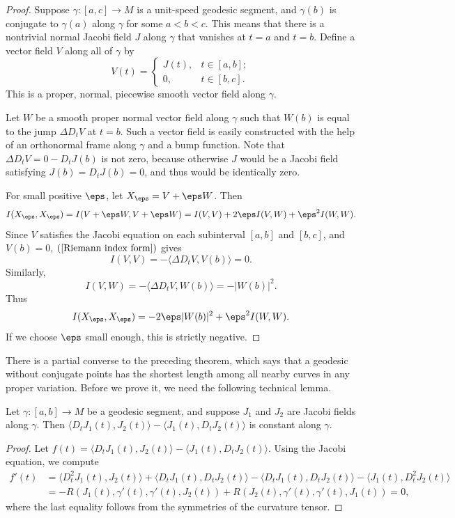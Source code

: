 \begin{proof}
Suppose $\gamma:[a,c]\to M$ is a unit-speed geodesic segment, and $\gamma(b)$ is conjugate to $\gamma(a)$ along $\gamma$ for some $a<b<c$. This means that there is a 
nontrivial normal Jacobi field $J$ along $\gamma$ that vanishes at $t=a$ and $t=b$. Define a vector field $V$ along all of $\gamma$ by
\[V(t)=\begin{cases}
J(t),&t\in[a,b];\\
0,&t\in[b,c].
\end{cases}\]
This is a proper, normal, piecewise smooth vector field along $\gamma$.\par
Let $W$ be a smooth proper normal vector field along $\gamma$ such that $W(b)$ is equal to the jump $\Delta D_tV$ at $t=b$. Such a vector field is easily constructed 
with the help of an orthonormal frame along $\gamma$ and a bump function. Note that $\Delta D_tV=0-D_tJ(b)$ is not zero, because otherwise $J$ would be a Jacobi field 
satisfying $J(b)=D_tJ(b)=0$, and thus would be identically zero.\par
For small positive $\eps$, let $X_{\eps}=V+\eps W$. Then
\begin{align*}
I(X_\eps,X_{\eps})=I(V+\eps W,V+\eps W)=I(V,V)+2\eps I(V,W)+\eps^2 I(W,W).
\end{align*}
Since $V$ satisfies the Jacobi equation on each subinterval $[a,b]$ and $[b,c]$, and $V(b)=0$, $(\ref{Riemann index form})$ gives
\[I(V,V)=-\langle\Delta D_tV,V(b)\rangle=0.\]
Similarly,
\[I(V,W)=-\langle\Delta D_tV,W(b)\rangle=-|W(b)|^2.\]
Thus
\[I(X_\eps,X_\eps)=-2\eps|W(b)|^2+\eps^2I(W,W).\]
If we choose $\eps$ small enough, this is strictly negative.
\end{proof}
There is a partial converse to the preceding theorem, which says that a geodesic without conjugate points has the shortest length among all nearby curves in any proper 
variation. Before we prove it, we need the following technical lemma.
\begin{lemma}\label{Riemann no int conjugate lem}
Let $\gamma:[a,b]\to M$ be a geodesic segment, and suppose $J_1$ and $J_2$ are Jacobi fields along $\gamma$. Then $\langle D_tJ_1(t),J_2(t)\rangle-\langle J_1(t),D_tJ_2(t)\rangle$ 
is constant along $\gamma$.
\end{lemma}
\begin{proof}
Let $f(t)=\langle D_tJ_1(t),J_2(t)\rangle-\langle J_1(t),D_tJ_2(t)\rangle$. Using the Jacobi equation, we compute
\begin{align*}
f'(t)&=\langle D^2_tJ_1(t),J_2(t)\rangle+\langle D_tJ_1(t),D_tJ_2(t)\rangle-\langle D_tJ_1(t),D_tJ_2(t)\rangle-\langle J_1(t),D_t^2J_2(t)\rangle\\
&=-R(J_1(t),\gamma'(t),\gamma'(t),J_2(t))+R(J_2(t),\gamma'(t),\gamma'(t),J_1(t))=0,
\end{align*}
where the last equality follows from the symmetries of the curvature tensor.
\end{proof}
